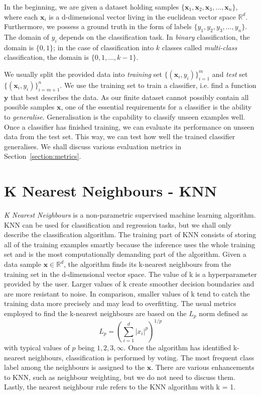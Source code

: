 In the beginning, we are given a dataset holding samples $\{\mathbf{x}_1, \mathbf{x}_2,
\mathbf{x}_3, \dots, \mathbf{x}_n\}$, where each $\mathbf{x}_i$ is a d-dimensional vector living in
the euclidean vector space $\mathbb{R}^d$. Furthermore, we possess a ground truth in the form of
labels $\{y_1, y_2, y_3, \dots, y_n\}$. The domain of $y_i$ depends on the classification task. In
\emph{binary} classification, the domain is $\{0, 1\}$; in the case of classification into $k$
classes called \emph{multi-class} classification, the domain is $\{0, 1, \dots, k - 1\}$.

We usually split the provided data into \emph{training} set $\{(\mathbf{x}_i, y_i)\}_{i=1}^{m}$ and
\emph{test} set $\{(\mathbf{x}_i, y_i)\}_{i=m + 1}^{n}$. We use the training set to train a
classifier, i.e. find a function $\mathbf{y}$ that best describes the data. As our finite dataset
cannot possibly contain all possible samples $\mathbf{x}$, one of the essential requirements for a
classifier is the ability to \emph{generalise}. Generalisation is the capability to classify unseen
examples well. Once a classifier has finished training, we can evaluate its performance on unseen
data from the test set. This way, we can test how well the trained classifier generalises. We shall
discuss various evaluation metrics in Section~\ref{section:metrics}.


\section{K Nearest Neighbours - KNN}
\label{section:knn}

\emph{K Nearest Neighbours} is a non-parametric supervised machine learning algorithm. KNN can be
used for classification and regression tasks, but we shall only describe the classification
algorithm. The training part of KNN consists of storing all of the training examples smartly
because the inference uses the whole training set and is the most computationally demanding part of
the algorithm. Given a data sample $\mathbf{x} \in \mathbb{R}^d$, the algorithm finds its k-nearest
neighbours from the training set in the d-dimensional vector space. The value of k is a
hyperparameter provided by the user. Larger values of k create smoother decision boundaries and are
more resistant to noise. In comparison, smaller values of k tend to catch the training data more
precisely and may lead to overfitting. The usual metrics employed to find the k-nearest neighbours
are based on the $L_p$ norm defined as
\begin{equation}
    L_p = \left(\sum_{i=1}^{d} \lvert x_i \rvert^p\right)^{1/p}
\end{equation}
with typical values of $p$ being $ 1, 2, 3, \infty$. Once the algorithm has identified k-nearest
neighbours, classification is performed by voting. The most frequent class label among the
neighbours is assigned to the $\mathbf{x}$. There are various enhancements to KNN, such as
neighbour weighting, but we do not need to discuss them. Lastly, the nearest neighbour rule refers
to the KNN algorithm with k = 1.


